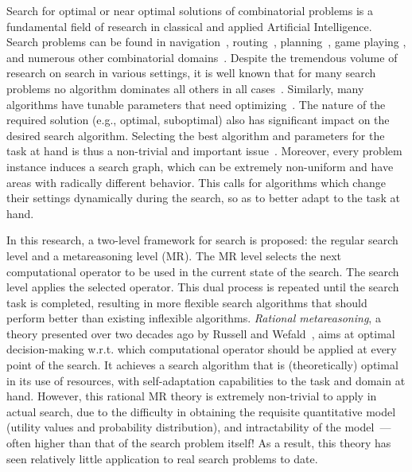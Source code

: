 Search for optimal or near optimal solutions of combinatorial problems
is a fundamental field of research in classical and applied Artificial
Intelligence. Search problems can be found in
navigation~\cite{Kocsis.uct}, routing~\cite{Bellman.routing},
planning~\cite{Domshlak.maxornot}, game
playing \cite{Braudis.pachi,Good.chess}, and numerous other
combinatorial domains~\cite{Korf.partitioning}.  Despite the
tremendous volume of research on search in various settings, it is
well known that for many search problems no algorithm dominates all
others in all cases~\cite{Wolpert.nofree}. Similarly, many algorithms
have tunable parameters that need
optimizing~\cite{Hutter.spo,TolpinShimony.raticomp}. The nature of the
required solution (e.g., optimal, suboptimal) also has
significant impact on the desired search algorithm. Selecting the best
algorithm and parameters for the task at hand is thus a non-trivial
and important issue~\cite{Allen.selheur,Gomes.portfolio}. Moreover,
every problem instance induces a search graph, which can be extremely
non-uniform and have areas with radically different behavior. This
calls for algorithms which change their settings dynamically during
the search, so as to better adapt to the task at hand.

In this research, a two-level framework for search is proposed: the
regular search level and a metareasoning level (MR). The MR level
selects the next computational operator to be used in the current
state of the search. The search level applies the selected
operator. This dual process is repeated until the search task is
completed, resulting in more flexible search algorithms that should
perform better than existing inflexible algorithms.  \textit{Rational
metareasoning}, a theory presented over two decades ago by Russell and
Wefald~\cite{Russell.right}, aims at optimal decision-making
w.r.t. which computational operator should be applied at every point
of the search. It achieves a search algorithm that is (theoretically)
optimal in its use of resources, with self-adaptation capabilities to
the task and domain at hand. However, this rational MR theory is
extremely non-trivial to apply in actual search, due to the difficulty
in obtaining the requisite quantitative model (utility values and
probability distribution), and intractability of the
model~\cite{Conitzer.complexity}---often higher than that of the
search problem itself!  As a result, this theory has seen relatively
little application to real search problems to date.


